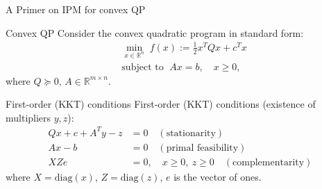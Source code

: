 



\begin{frame}{A Primer on IPM for convex QP}
  \begin{block}{Convex QP}
Consider the convex quadratic program in standard form:
\begin{align*}
  &\min_{x\in\mathbb{R}^n} \; f(x) := \tfrac{1}{2}x^T Q x + c^T x\\
  &\text{subject to }\; A x = b, \quad x \ge 0,
\end{align*}
where $Q\succeq 0$, $A\in\mathbb{R}^{m\times n}$.
\end{block}
\begin{block}{First-order (KKT) conditions}
First-order (KKT) conditions (existence of multipliers $y,z$):
\begin{align*}
  Qx + c + A^T y - z &= 0 \quad (\text{stationarity})\\
  Ax - b &= 0 \quad (\text{primal feasibility})\\
  X Z e &= 0,\quad x\ge0,\ z\ge0 \quad(\text{complementarity})
\end{align*}
where $X=\mathrm{diag}(x)$, $Z=\mathrm{diag}(z)$, $e$ is the vector of ones.
\end{block}


\end{frame}

